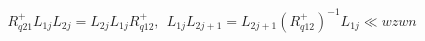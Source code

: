 \begin{equation}
{R}^+_{q21}L_{1j}L_{2j}
= L_{2j} L_{1j}{R}^+_{q12}, \ \ L_{1j} L_{2j+1} = L_{2j+1}({R}^+_{q12})^{-1}
 L_{1j} 
\ll{wzwn}\end{equation}

